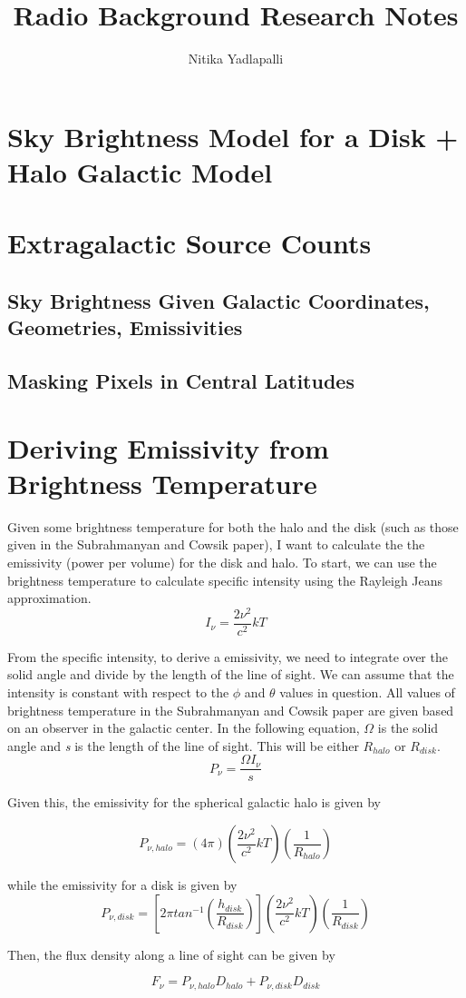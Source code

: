 \documentclass[letterpaper, 10pt]{article}
\title{Radio Background Research Notes}
\author{Nitika Yadlapalli}
\date{}
\begin{document}
\maketitle

\section{Sky Brightness Model for a Disk + Halo Galactic Model}

\section{Extragalactic Source Counts}

\subsection{Sky Brightness Given Galactic Coordinates, Geometries, Emissivities}



\subsection{Masking Pixels in Central Latitudes}

\section{Deriving Emissivity from Brightness Temperature}
Given some brightness temperature for both the halo and the disk (such as those given in the Subrahmanyan and Cowsik paper), I want to calculate the the emissivity (power per volume) for the disk and halo. To start, we can use the brightness temperature to calculate specific intensity using the Rayleigh Jeans approximation. 
\[ I_{\nu} = \frac{2\nu^{2}}{c^{2}}kT \]

From the specific intensity, to derive a emissivity, we need to integrate over the solid angle and divide by the length of the line of sight. We can assume that the intensity is constant with respect to the $\phi$ and $\theta$ values in question. All values of brightness temperature in the Subrahmanyan and Cowsik paper are given based on an observer in the galactic center. In the following equation, $\Omega$ is the solid angle and \emph{s} is the length of the line of sight. This will be either $R_{halo}$ or $R_{disk}$.
\[ P_{\nu} = \frac{\Omega I_{\nu}}{s} \]

Given this, the emissivity for the spherical galactic halo is given by 

\[P_{\nu, halo} = (4\pi)\left(\frac{2\nu^{2}}{c^{2}}kT\right)\left(\frac{1}{R_{halo}}\right)\]

while the emissivity for a disk is given by 
\[P_{\nu, disk} = \left[ 2\pi tan^{-1}\left(\frac{h_{disk}}{R_{disk}}\right) \right]\left(\frac{2\nu^{2}}{c^{2}}kT\right)\left(\frac{1}{R_{disk}}\right)\]

Then, the flux density along a line of sight can be given by 

\[F_{\nu} = P_{\nu, halo}D_{halo} + P_{\nu, disk}D_{disk} \]
\end{document}
